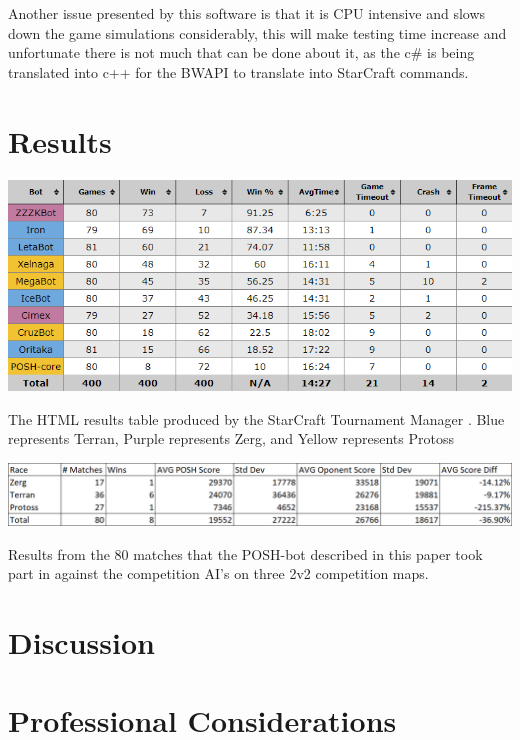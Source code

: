 \documentclass[journal]{IEEEtran}
\begin{document}
Another issue presented by this software is that it is CPU intensive and slows down the game simulations considerably, this will make testing time increase and unfortunate there is not much that can be done about it, as the c\# is being translated into c++ for the BWAPI to translate into StarCraft commands.


\section{Results}
\begin{table}[]
	\centering
	\includegraphics[width=\textwidth]{STMResultsWithBot}
	\caption{The HTML results table produced by the StarCraft Tournament Manager \cite{Tournament}. Blue represents Terran, Purple represents Zerg, and Yellow represents Protoss}
	\label{Table2}
\end{table}
\begin{table}[]
	\centering
	\includegraphics[width=\textwidth]{POSH-botWin}
	\caption{Results from the 80 matches that the POSH-bot described in this paper took part in against the competition AI's on three 2v2 competition maps.}
	\label{Table3}
\end{table}


\section{Discussion}


\section{Professional Considerations}
\end{document}
